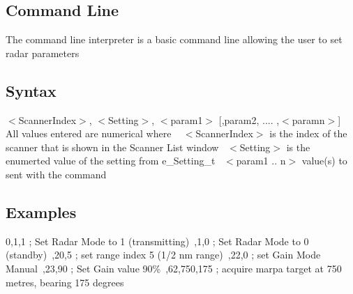 \hypertarget{page1_cli}{}\subsection{Command Line}\label{page1_cli}
The command line interpreter is a basic command line allowing the user to set radar parameters~\newline
\hypertarget{page1_syntax}{}\subsection{Syntax}\label{page1_syntax}
$<$\+Scanner\+Index$>$, $<$\+Setting$>$, $<$param1$>$ \mbox{[},param2, .... ,$<$paramn$>$\mbox{]}~\newline
All values entered are numerical where ~\newline
$<$\+Scanner\+Index$>$ is the index of the scanner that is shown in the Scanner List window~\newline
$<$\+Setting$>$ is the enumerted value of the setting from e\+\_\+\+Setting\+\_\+t~\newline
$<$param1 .. n$>$ value(s) to sent with the command~\newline
\hypertarget{page1_examples}{}\subsection{Examples}\label{page1_examples}
0,1,1 ; Set Radar Mode to 1 (transmitting)~,1,0 ; Set Radar Mode to 0 (standby)~,20,5 ; set range index 5 (1/2 nm range)~,22,0 ; set Gain Mode Manual~,23,90 ; Set Gain value 90\%~,62,750,175 ; acquire marpa target at 750 metres, bearing 175 degrees~\newline
